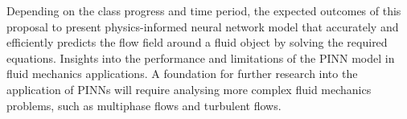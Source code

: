 Depending on the class progress and time period, the expected outcomes of this proposal to present physics-informed neural network model that accurately and efficiently predicts the flow field around a fluid object by solving the required equations. Insights into the performance and limitations of the PINN model in fluid mechanics applications. A foundation for further research into the application of PINNs will require analysing more complex fluid mechanics problems, such as multiphase flows and turbulent flows.
